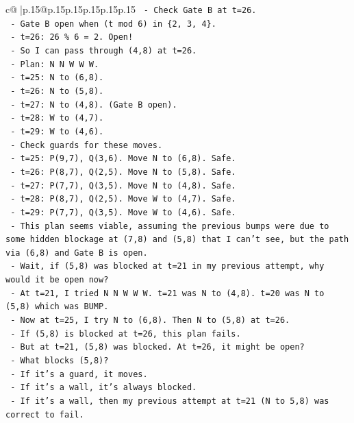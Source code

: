\documentclass{article}
\begin{document}
{\begin{supertabular}{c@{$\;$}|p{.15\linewidth}@{}p{.15\linewidth}p{.15\linewidth}p{.15\linewidth}p{.15\linewidth}p{.15\linewidth}}
{{{\texttt{  {-} Check Gate B at t=26.} \\
\texttt{  {-} Gate B open when (t mod 6) in \{2, 3, 4\}.} \\
\texttt{  {-} t=26: 26 \% 6 = 2. Open!} \\
\texttt{  {-} So I can pass through (4,8) at t=26.} \\
\texttt{  {-} Plan: N N W W W.} \\
\texttt{  {-} t=25: N to (6,8).} \\
\texttt{  {-} t=26: N to (5,8).} \\
\texttt{  {-} t=27: N to (4,8). (Gate B open).} \\
\texttt{  {-} t=28: W to (4,7).} \\
\texttt{  {-} t=29: W to (4,6).} \\
\texttt{  {-} Check guards for these moves.} \\
\texttt{  {-} t=25: P(9,7), Q(3,6). Move N to (6,8). Safe.} \\
\texttt{  {-} t=26: P(8,7), Q(2,5). Move N to (5,8). Safe.} \\
\texttt{  {-} t=27: P(7,7), Q(3,5). Move N to (4,8). Safe.} \\
\texttt{  {-} t=28: P(8,7), Q(2,5). Move W to (4,7). Safe.} \\
\texttt{  {-} t=29: P(7,7), Q(3,5). Move W to (4,6). Safe.} \\
\texttt{  {-} This plan seems viable, assuming the previous bumps were due to some hidden blockage at (7,8) and (5,8) that I can't see, but the path via (6,8) and Gate B is open.} \\
\texttt{  {-} Wait, if (5,8) was blocked at t=21 in my previous attempt, why would it be open now?} \\
\texttt{  {-} At t=21, I tried N N W W W. t=21 was N to (4,8). t=20 was N to (5,8) which was BUMP.} \\
\texttt{  {-} Now at t=25, I try N to (6,8). Then N to (5,8) at t=26.} \\
\texttt{  {-} If (5,8) is blocked at t=26, this plan fails.} \\
\texttt{  {-} But at t=21, (5,8) was blocked. At t=26, it might be open?} \\
\texttt{  {-} What blocks (5,8)?} \\
\texttt{  {-} If it's a guard, it moves.} \\
\texttt{  {-} If it's a wall, it's always blocked.} \\
\texttt{  {-} If it's a wall, then my previous attempt at t=21 (N to 5,8) was correct to fail.} \\
}}}
\end{supertabular}}
\end{document}
